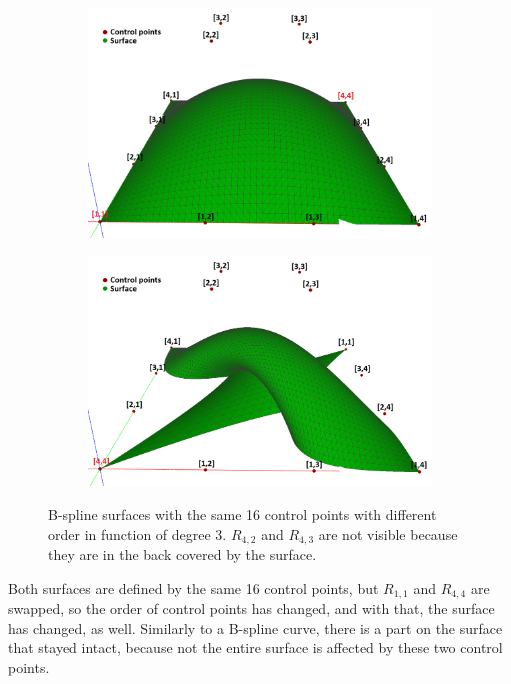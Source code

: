 \documentclass{article}
\begin{document}
\begin{figure}[H]
\centering
\begin{subfigure}[b]{0.48\textwidth}
\includegraphics[width=\textwidth]{bsplinesurface1}
\caption{}
\label{bsplinesurface2}
\end{subfigure}
\begin{subfigure}[b]{0.48\textwidth}
\includegraphics[width=\textwidth]{bsplinesurface2}
\caption{}
\label{bsplinesurface2}
\end{subfigure}
\caption{B-spline surfaces with the same 16 control points with different order in function of degree 3. $R_{4,2}$ and $R_{4,3}$ are not visible because they are in the back covered by the surface.}
\label{bsplinesurfacecomparsion}
\end{figure}

Both surfaces are defined by the same 16 control points, but $R_{1,1}$ and $R_{4,4}$ are swapped, so the order of control points has changed, and with that, the surface has changed, as well. Similarly to a B-spline curve, there is a part on the surface that stayed intact, because not the entire surface is affected by these two control points.
\end{document}
